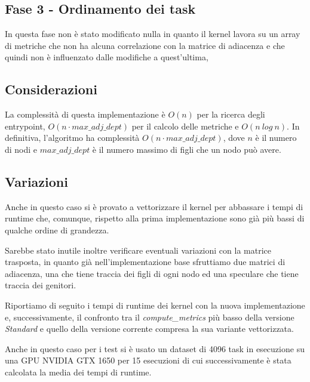 \documentclass[../relazione.tex]{subfiles}
\begin{document}
\subsection{Fase 3 - Ordinamento dei task}
In questa fase non è stato modificato nulla in quanto il kernel lavora su un array di metriche che non ha alcuna correlazione con la matrice di adiacenza e che quindi non è influenzato dalle modifiche a quest'ultima,

\subsection{Considerazioni}
La complessità di questa implementazione è $O(n)$ per la ricerca degli entrypoint, $O(n \cdot max\_adj\_dept)$ per il calcolo delle metriche e $O(n\ log\ n)$.
In definitiva, l'algoritmo ha complessità $O(n \cdot max\_adj\_dept)$, dove $n$ è il numero di nodi e $max\_adj\_dept$ è il numero massimo di figli che un nodo può avere.

\subsection{Variazioni}
Anche in questo caso si è provato a vettorizzare il kernel per abbassare i tempi di runtime che, comunque, rispetto alla prima implementazione sono già più bassi di qualche ordine di grandezza.

Sarebbe stato inutile inoltre verificare eventuali variazioni con la matrice trasposta, in quanto già nell'implementazione base sfruttiamo due matrici di adiacenza, una che tiene traccia dei figli di ogni nodo ed una speculare che tiene traccia dei genitori.

Riportiamo di seguito i tempi di runtime dei kernel con la nuova implementazione e, successivamente, il confronto tra il \textit{compute\_metrics} più basso della versione \textit{Standard} e quello della versione corrente compresa la sua variante vettorizzata.

Anche in questo caso per i test si è usato un dataset di 4096 task in esecuzione su una GPU NVIDIA GTX 1650 per 15 esecuzioni di cui successivamente è stata calcolata la media dei tempi di runtime.
\end{document}
